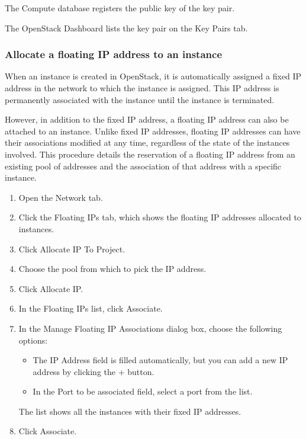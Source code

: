 The Compute database registers the public key of the key pair.

The \gls{OpenStack Dashboard} lists the key pair on the Key Pairs tab.

\subsubsection{Allocate a floating IP address to an instance}\label{allocate-a-floating-ip-address-to-an-instance}

When an instance is created in \gls{OpenStack}, it is automatically assigned a
fixed IP address in the network to which the instance is assigned. This
IP address is permanently associated with the instance until the
instance is terminated.

However, in addition to the fixed IP address, a floating IP address can
also be attached to an instance. Unlike fixed IP addresses, floating IP
addresses can have their associations modified at any time, regardless
of the state of the instances involved. This procedure details the
reservation of a floating IP address from an existing pool of addresses
and the association of that address with a specific instance.

\begin{enumerate}
\item Open the Network tab.
\item Click the Floating IPs tab, which shows the floating IP
  addresses allocated to instances.
\item Click Allocate IP To Project.
\item Choose the pool from which to pick the IP address.
\item Click Allocate IP.
\item In the Floating IPs list, click Associate.
\item In the Manage Floating IP Associations dialog box, choose the
  following options:

  \begin{itemize}
  \item The IP Address field is filled automatically, but you can add
    a new IP address by clicking the + button.
  \item In the Port to be associated field, select a port from the
    list.
  \end{itemize}

  The list shows all the instances with their fixed IP addresses.
\item Click Associate.
\end{enumerate}

